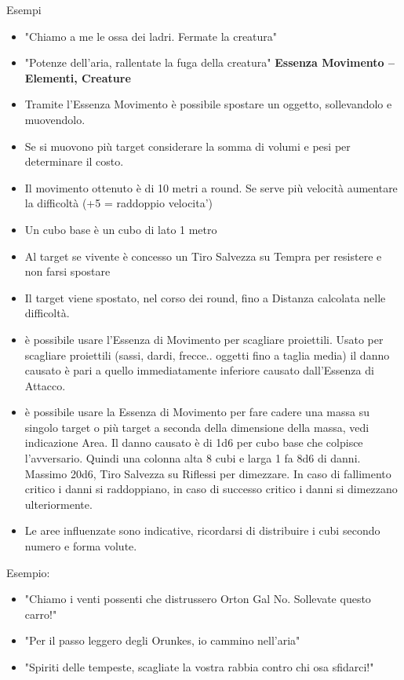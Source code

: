 \documentclass[a4paper,11pt,twoside,openany]{book}
\begin{document}
Esempi
\begin{itemize}
	\item 
	"Chiamo a me le ossa dei ladri. Fermate la creatura"
	\item 
	"Potenze dell'aria, rallentate la fuga della creatura" 
	\textbf{Essenza Movimento -- Elementi, Creature}
	\item 
	Tramite l'Essenza Movimento è possibile spostare un oggetto, sollevandolo e muovendolo. 
	\item 
	Se si muovono più target considerare la somma di volumi e pesi per determinare il costo. 
	\item 
	Il movimento ottenuto è di 10 metri a round. Se serve più velocità aumentare la difficoltà (+5 = raddoppio velocita') 
	\item 
	Un cubo base è un cubo di lato 1 metro 
	\item 
	Al target se vivente è concesso un Tiro Salvezza su Tempra per resistere e non farsi spostare 
	\item 
	Il target viene spostato, nel corso dei round, fino a Distanza calcolata nelle difficoltà. 
	\item 
	è possibile usare l'Essenza di Movimento per scagliare proiettili. Usato per scagliare proiettili (sassi, dardi, frecce.. oggetti fino a taglia media) il danno causato è pari a quello immediatamente inferiore causato dall'Essenza di Attacco. 
	\item 
	è possibile usare la Essenza di Movimento per fare cadere una massa su singolo target o più target a seconda della dimensione della massa, vedi indicazione Area. Il danno causato è di 1d6 per cubo base che colpisce l'avversario. Quindi una colonna alta 8 cubi e larga 1 fa 8d6 di danni. Massimo 20d6, Tiro Salvezza su Riflessi per dimezzare. In caso di fallimento critico i danni si raddoppiano, in caso di successo critico i danni si dimezzano ulteriormente. 
	\item 
	Le aree influenzate sono indicative, ricordarsi di distribuire i cubi secondo numero e forma volute. 
\end{itemize}
\bigskip


Esempio:
\begin{itemize}
\item 
"Chiamo i venti possenti che distrussero Orton Gal No. Sollevate questo carro!" 
\item 
"Per il passo leggero degli Orunkes, io cammino nell'aria"
\item 
"Spiriti delle tempeste, scagliate la vostra rabbia contro chi osa sfidarci!" 
\end{itemize}
\end{document}
